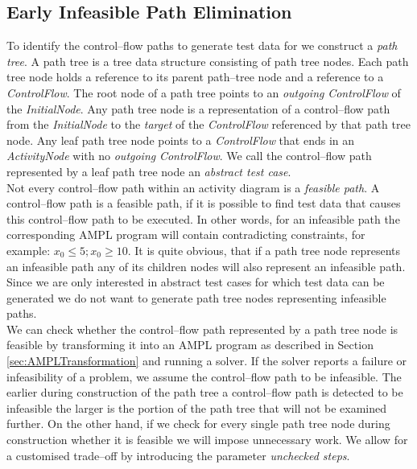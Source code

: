 \documentclass[runningheads,a4paper]{llncs}%
\newcommand{\UMLType}[1]{\textsf{\textit{#1}}} %
\newcommand{\UMLReference}[1]{\textsf{\textit{#1}}} %
\begin{document}
\subsection{Early Infeasible Path Elimination}%
\label{sec:InfeasiblePathElimination}%
To identify the control--flow paths to generate test data for we construct a \emph{path tree}. A path tree is a tree data structure consisting of path tree nodes. Each path tree node holds a reference to its parent path--tree node and a reference to a \UMLType{ControlFlow}. The root node of a path tree points to an \UMLReference{outgoing} \UMLType{ControlFlow} of the \UMLType{InitialNode}. Any path tree node is a representation of a control--flow path from the \UMLType{InitialNode} to the \UMLReference{target} of the \UMLType{ControlFlow} referenced by that path tree node. Any leaf path tree node points to a \UMLType{ControlFlow} that ends in an \UMLType{ActivityNode} with no \UMLReference{outgoing} \UMLType{ControlFlow}. We call the control--flow path represented by a leaf path tree node an \emph{abstract test case}.\\
Not every control--flow path within an activity diagram is a \emph{feasible path}. A control--flow path is a feasible path, if it is possible to find test data that causes this control--flow path to be executed. In other words, for an infeasible path the corresponding AMPL program will contain contradicting constraints, for example: $x_0\leq5; x_0\geq10$. It is quite obvious, that if a path tree node represents an infeasible path any of its children nodes will also represent an infeasible path. Since we are only interested in abstract test cases for which test data can be generated we do not want to generate path tree nodes representing infeasible paths.\\
We can check whether the control--flow path represented by a path tree node is feasible by transforming it into an AMPL program as described in Section \ref{sec:AMPLTransformation} and running a solver. If the solver reports a failure or infeasibility of a problem, we assume the control--flow path to be infeasible. The earlier during construction of the path tree a control--flow path is detected to be infeasible the larger is the portion of the path tree that will not be examined further. On the other hand, if we check for every single path tree node during construction whether it is feasible we will impose unnecessary work. We allow for a customised trade--off by introducing the parameter \emph{unchecked steps}.%
\end{document}
